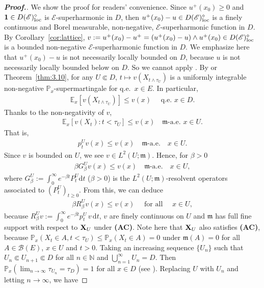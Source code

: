 \documentclass[12pt,a4paper]{article}
\renewcommand{\d}{\mathrm{d}}
\newcommand{\m}{\mathfrak{m} }
\newcommand{\loc}{{\rm loc}}
\newcommand{\1}{{\bf 1}}
\begin{document}
\begin{proof}[{\bf Proof.}]
We show the proof for readers' convenience.  
Since $u^+(x_0) \ge 0$ and $\1 \in 
D(\mathscr{E})_{\loc}^{\diamond}$ is $\mathscr{E}$-superharmonic in $D$, then $u^+(x_0) - u \in 
D(\mathscr{E})_{\loc}^{\diamond}$ is a finely continuous and Borel measurable, non-negative, $\mathscr{E}$-superharmonic function in $D$. By Corollary~\ref{cor:lattice}, 
$v := u^+(x_0) - u^+ = (u^+(x_0) - u) \wedge u^+(x_0)\in D(\mathscr{E})_{\loc}^{\diamond}$ 
is a bounded non-negative $\mathscr{E}$-superharmonic function 
in $D$. We emphasize here that $u^+(x_0) - u$ is not necessarily 
locally bounded on $D$, because $u$ is not necessarily locally bounded below on $D$. So we cannot apply \cite[Corollary~2.10(iv)]{CK}.  
By \cite[Theorem~3.10]{CK} or Theorem~\ref{thm:3.10}, for any $U\Subset D$, $t\mapsto v(X_{t\land \tau_U})$ is a uniformly integrable non-negative $\mathbb{P}_x$-supermartingale for q.e.~$x\in E$. In particular, 
\begin{align*}
\mathbb{E}_x[v(X_{t\land\tau_U})]\leq v(x)\quad\text{ q.e.~}x\in D.
\end{align*}
Thanks to the non-negativity of $v$, 
\begin{align*}
\mathbb{E}_x[v(X_t):t<\tau_U]\leq v(x)\quad{\m}\text{-a.e.~}x\in U. 
\end{align*}
That is,  
\begin{align*}
p_t^Uv(x)\leq v(x)\quad {\m}\text{-a.e.}\quad x\in U.
\end{align*}
Since $v$ is bounded on $U$, we see $v\in L^2(U;{\m})$. 
Hence, for $\beta>0$  
\begin{align*}
\beta G_{\beta}^Uv(x)\leq v(x)\quad {\m}\text{-a.e.}\quad x\in U,
\end{align*}
where $G_{\beta}^U:=\int_0^{\infty}e^{-\beta t}P_t^U{\d} t$\; ($\beta>0$) is the $L^2(U;{\m})$-resolvent operators associated to $(P_t^U)_{t\geq0}$. 
From this, we can deduce 
\begin{align*}
\beta R_{\beta}^Uv(x)\leq v(x)\quad \text{ for all }\quad x\in U, 
\end{align*}
because $R_{\beta}^Uv:=\int_0^{\infty}e^{-\beta t}p_t^U\,v\,{\d} t$,  $v$ are finely continuous on $U$ and 
${\m}$ has full fine support with respect to ${\bf X}_U$ under {\bf (AC)}. 
Note here that ${\bf X}_U$ also satisfies {\bf (AC)}, because 
$\mathbb{P}_x(X_t\in A,t<\tau_U)\leq\mathbb{P}_x(X_t\in A)=0$ under ${\m}(A)=0$ for all $A\in\mathscr{B}(E)$, $x\in U$ and $t>0$. 
Taking an increasing sequence $\{U_n\}$ such that $U_n\Subset U_{n+1}\Subset D$ for all $n\in\mathbb{N}$ and $\bigcup_{n=1}^{\infty}U_n=D$. Then $\mathbb{P}_x(\lim_{n\to\infty}\tau_{U_n}=\tau_D)=1$ for all $x\in D$ (see \cite[Theorem~4.6(iv)]{Kw:maximumprinciple}). Replacing $U$ with $U_n$ and letting $n\to\infty$, we have 

\end{proof}
\end{document}
